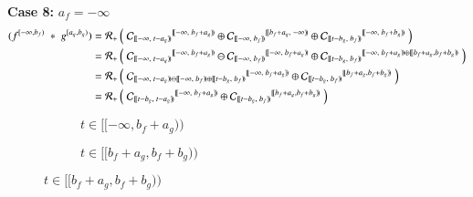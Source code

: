 \textbf{Case 8:} $a_f=-\infty$
\begin{align*}
	(f^{[-\infty,b_f)} \;*\; g^{[a_g,b_g)})
	= \R[+] &\left( \; 
			{\C[ [\![-\infty,\;t-a_g)\!) ]}^{[\![-\infty,\; b_f+a_g)\!)} \oplus
			{\C[ [\![-\infty,\;b_f)\!) ]}^{[\![b_f+a_g,\; -\infty)\!)} \oplus
			{\C[ [\![t-b_g,\;b_f)\!) ]}^{[\![-\infty,\; b_f+b_g)\!)} 
		\; \right) \\	
	= \R[+] &\left( \; 
			{\C[ [\![-\infty,\;t-a_g)\!) ]}^{[\![-\infty,\; b_f+a_g)\!)} \ominus
			{\C[ [\![-\infty,\;b_f)\!) ]}^{[\![-\infty, \; b_f+a_g)\!)} \oplus
			{\C[ [\![t-b_g,\;b_f)\!) ]}^{[\![-\infty,\; b_f+a_g)\!)\oplus[\![b_f+a_g, b_f+b_g)\!)} 
		\; \right) \\
	= \R[+] &\left( \; 
			{\C[ [\![-\infty,\;t-a_g)\!)
				\ominus[\![-\infty,\;b_f)\!)
				\oplus[\![t-b_g,\;b_f)\!) ]}^{[\![-\infty,\; b_f+a_g)\!)} \oplus
			{\C[ [\![t-b_g,\;b_f)\!) ]}^{[\![b_f+a_g, b_f+b_g)\!)} 
		\; \right) \\
	= \R[+] &\left( \; 
			{\C[ [\![t-b_g,\;t-a_g)\!) ]}^{[\![-\infty,\; b_f+a_g)\!)} \oplus
			{\C[ [\![t-b_g,\;b_f)\!) ]}^{[\![b_f+a_g, b_f+b_g)\!)} 
		\; \right)
\end{align*}
\vspace{-1.5cm}
\begin{figure}[h]
	\centering
	\begin{subfigure}[h]{0.4\textwidth}
		\caption{$t \in [\![-\infty, b_f+a_g)\!)$} 
		\centering
	\end{subfigure}
	\begin{subfigure}[h]{0.4\textwidth}
		\caption{$t \in [\![b_f+a_g, b_f+b_g)\!)$} 
		\centering
	\end{subfigure}
\end{figure}


